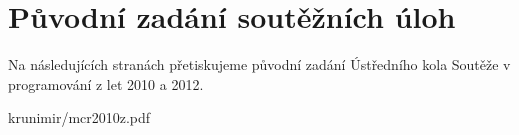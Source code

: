 \appendix

\chapter{Původní zadání soutěžních úloh}

Na následujících stranách přetiskujeme původní zadání Ústředního kola Soutěže v
programování z let 2010 a 2012.


\newpage 

\label{pdf:krunimir}
 {krunimir/mcr2010z.pdf}

\label{pdf:banshee}

